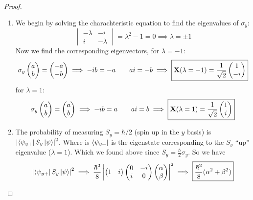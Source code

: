 \begin{proof}

    \begin{enumerate}
        \item We begin by solving the charachteristic equation to find
            the eigenvalues of $\sigma_y$:
            \[
            \begin{vmatrix}
                -\lambda & -i \\
                i & -\lambda
            \end{vmatrix} = \lambda^2 -  1 = 0 \implies
            \boxed{\lambda = \pm 1}
            \]
            Now we find the corresponding eigenvectors, for $\lambda =
            -1$:
            \[
            \sigma_y \begin{pmatrix} a \\ b \end{pmatrix} = \begin{pmatrix} -a \\ -b \end{pmatrix} \implies 
            -ib = -a \qquad ai = -b \implies
            \boxed{\mathbf{X}(\lambda = -1) =
            \frac{1}{\sqrt{2}}\begin{pmatrix} 1 \\ -i \end{pmatrix}}
            \]
            for $\lambda = 1$:
            \[
            \sigma_y \begin{pmatrix} a \\ b \end{pmatrix} = \begin{pmatrix} a \\ b \end{pmatrix} \implies 
            -ib = a \qquad ai = b \implies
            \boxed{\mathbf{X}(\lambda = 1) =
            \frac{1}{\sqrt{2}}\begin{pmatrix} 1 \\ i \end{pmatrix}}
            \]
            
        \item
            The probability of measuring $S_y = \hbar/2$ (spin up in the
            $y$ basis) is $\left|\left< \psi_{y+} \right| S_y
            \left| \psi \right>\right|^2$. Where is $\left< \psi_{y+} \right|$ is the
            eigenstate corresponding to the
            $S_y$ ``up'' eigenvalue ($\lambda = 1$). Which we found
            above since $S_y = \frac{\hbar}{2}\sigma_y$. So we have
            \[
                \left| \left< \psi_{y+} \right| S_y \left| \psi \right> \right|^2 \implies
                \frac{\hbar^2}{8} \left|
                    \begin{pmatrix} 1 & i \end{pmatrix}
                    \begin{pmatrix} 0 & -i \\ i & 0 \end{pmatrix}
                    \begin{pmatrix} \alpha \\ \beta \end{pmatrix} \right|^2 \implies 
                    \boxed{\frac{\hbar^2}{8}(\alpha^2 + \beta^2)}
            \]

    \end{enumerate}


\end{proof}


